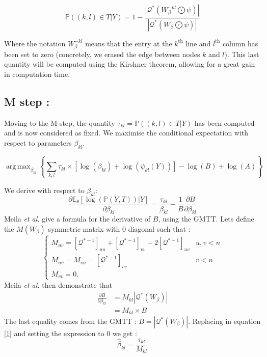 \documentclass[a4paper,10pt]{article}
\DeclareMathOperator*{\argmax}{arg\,max}
\begin{document}
\[ \mathds{P}((k,l)\in T | Y) =1-\frac{|\mathcal{Q}^*(W_{\beta}^{-kl}\bigodot\psi)|}{|\mathcal{Q}^*(W_{\beta}\bigodot\psi)|}\]

Where the notation $W_{\beta}^{-kl}$ means that the entry at the $k^{\text{th}}$ line and $l^{\text{th}}$ column has been set to zero
(concretely, we erased the edge between nodes $k$ and $l$). This last quantity will be computed using the Kirshner theorem, allowing for a great gain in computation time.


\subsection{M step :\\}
Moving to the M step, the quantity $\tau_{kl} = \mathds{P}((k,l)\in T | Y)$ has been computed and is now considered as fixed.
We maximise the conditional expectation with respect to parameters $\beta_{kl}$.


 \[\argmax_{\beta_{kl}} \left\{\sum_{k,l} \tau_{kl}\times \left[ \log(\beta_{kl}) + \log(\psi_{kl}(Y)) \right]
 -\log(B)+\log(A)\right\}\]



 We derive with respect to $\beta_{kl}$:
\begin{equation}
 \label{1} \frac{\partial\mathds{E}_\theta[\log(\mathds{P}(Y,T))|Y]}{\partial\beta_{kl}} =\frac{  \tau_{kl}}{\beta_{kl}} - \frac{1}{B}
\frac{\partial B}{\partial\beta_{kl}}
\end{equation}
 Meila \textit{et al.} give a formula for the derivative of $B$, using the GMTT. Lets define the $M(W_\beta)$ symmetric matrix with 0 diagonal such that :
 \[\begin{cases}
    M_{uv} = [\mathcal{Q}^{*-1}]_{uu} + [\mathcal{Q}^{*-1}]_{vv} -2[\mathcal{Q}^{*-1}]_{uv} & u,v < n\\
    M_{nv} =M_{vn} =[\mathcal{Q}^{*-1}]_{vv} & v<n\\
     M_{vv} =0.
   \end{cases}\]
Meila \textit{et al.} then demonstrate that 
\begin{align*}
 \frac{\partial B}{\partial\beta_{kl}} &= M_{kl} |\mathcal{Q}^*(W_\beta)|\\
 &=M_{kl} \times B
\end{align*}
The last equality comes from the GMTT : $B = |\mathcal{Q}^*(W_\beta)|$. Replacing in equation \ref{1} and setting the expression to 0 we get :
\[\boxed{\hat{\beta}_{kl} = \frac{ \tau_{kl}}{M_{kl}}}\]



\end{document}
